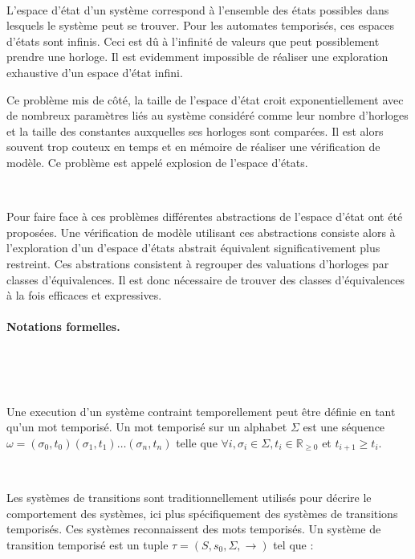 \documentclass{article}
\begin{document}
      ~

      L'espace d'état d'un système correspond à l'ensemble des états possibles
      dans lesquels le système peut se trouver. Pour les automates temporisés,
      ces espaces d'états sont infinis. Ceci est dû à l'infinité de valeurs que
      peut possiblement prendre une horloge. Il est evidemment impossible de
      réaliser une exploration exhaustive d'un espace d'état infini.

      Ce problème mis de côté, la taille de l'espace d'état croit
      exponentiellement avec de nombreux paramètres liés au système considéré
      comme leur nombre d'horloges et la taille des constantes auxquelles ses
      horloges sont comparées. Il est alors souvent trop couteux en temps et en
      mémoire de réaliser une vérification de modèle. Ce problème est appelé
      explosion de l'espace d'états.

      ~

      Pour faire face à ces problèmes différentes abstractions de l'espace
      d'état ont été proposées. Une vérification de modèle utilisant ces
      abstractions consiste alors à l'exploration d'un d'espace d'états abstrait
      équivalent significativement plus restreint. Ces abstrations consistent à
      regrouper des valuations d'horloges par classes d'équivalences. Il est
      donc nécessaire de trouver des classes d'équivalences à la fois efficaces
      et expressives.

    \paragraph{Notations formelles.} ~

      ~

      Une execution d'un système contraint temporellement peut être définie en
      tant qu'un mot temporisé. Un mot temporisé sur un alphabet $\Sigma$ est
      une séquence $\omega = (\sigma_0,t_0)(\sigma_1,t_1)\dots(\sigma_n,t_n)$
      telle que $\forall i, \sigma_i \in \Sigma, t_i \in \mathbb{R}_{\geq 0}$ et
      $t_{i+1} \geq t_i$.

      ~

      Les systèmes de transitions sont traditionnellement utilisés pour décrire
      le comportement des systèmes, ici plus spécifiquement des systèmes de
      transitions temporisés. Ces systèmes reconnaissent des mots temporisés. Un
      système de transition temporisé est un tuple $\tau = (S, s_0, \Sigma,
      \rightarrow)$ tel que :
\end{document}
